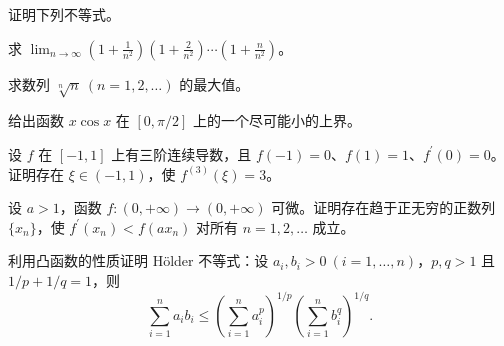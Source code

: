 \noindent\begin{minipage}{\textwidth}
证明下列不等式。
\end{minipage}\par\vfill
\newpage
\noindent\begin{minipage}{\textwidth}
求 $\displaystyle\lim_{n\to\infty}\left(1+\frac1{n^2}\right)\left(1+\frac2{n^2}\right)\cdots\left(1+\frac n{n^2}\right)$。
\end{minipage}\par\vfill
\noindent\begin{minipage}{\textwidth}
求数列 $\sqrt[n]{n}\ (n=1,2,\ldots)$ 的最大值。
\end{minipage}\par\vfill
\noindent\begin{minipage}{\textwidth}
给出函数 $x\cos x$ 在 $[0,\pi/2]$ 上的一个尽可能小的上界。
\end{minipage}\par\vfill
\noindent\begin{minipage}{\textwidth}
设 $f$ 在 $[-1,1]$ 上有三阶连续导数，且 $f(-1)=0$、$f(1)=1$、$f^{\prime}(0)=0$。证明存在 $\xi\in(-1,1)$，使 $f^{(3)}(\xi)=3$。
\end{minipage}\par\vfill
\newpage
\noindent\begin{minipage}{\textwidth}
设 $a>1$，函数 $f:(0,+\infty)\to(0,+\infty)$ 可微。证明存在趋于正无穷的正数列 $\{x_n\}$，使 $f^{\prime}(x_n)<f(ax_n)$ 对所有 $n=1,2,\ldots$ 成立。
\end{minipage}\par\vfill
\noindent\begin{minipage}{\textwidth}
利用凸函数的性质证明 Hölder 不等式：设 $a_i,b_i>0\ (i=1,\ldots,n)$，$p,q>1$ 且 $1/p+1/q=1$，则\[\sum_{i=1}^na_ib_i\le\left(\sum_{i=1}^na_i^p\right)^{1/p}\left(\sum_{i=1}^nb_i^q\right)^{1/q}.\]
\end{minipage}\par\vfill

